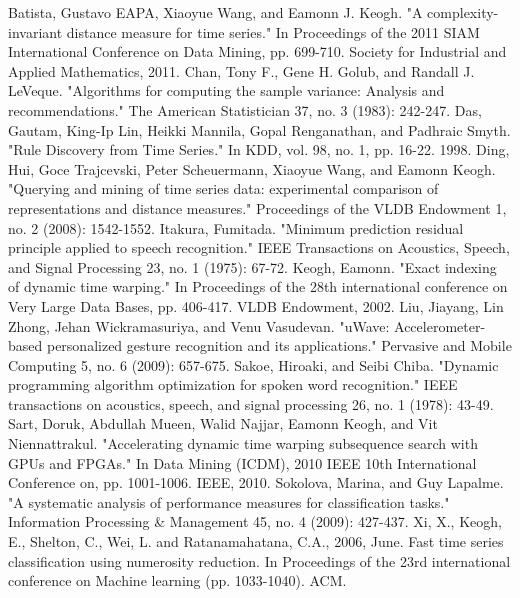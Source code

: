 \begin{thebibliography}{1}
     Batista, Gustavo EAPA, Xiaoyue Wang, and Eamonn J. Keogh. "A complexity-invariant
        distance measure for time series." In Proceedings of the 2011 SIAM International Conference on Data Mining, pp.
        699-710. Society for Industrial and Applied Mathematics, 2011.
     Chan, Tony F., Gene H. Golub, and Randall J. LeVeque. "Algorithms for computing the
        sample variance: Analysis and recommendations." The American Statistician 37, no. 3 (1983): 242-247.
     Das, Gautam, King-Ip Lin, Heikki Mannila, Gopal Renganathan, and Padhraic Smyth. "Rule
        Discovery from Time Series." In KDD, vol. 98, no. 1, pp. 16-22. 1998.
     Ding, Hui, Goce Trajcevski, Peter Scheuermann, Xiaoyue Wang, and Eamonn Keogh. "Querying
        and mining of time series data: experimental comparison of representations and distance measures." Proceedings
        of the VLDB Endowment 1, no. 2 (2008): 1542-1552.
     Itakura, Fumitada. "Minimum prediction residual principle applied to speech
        recognition." IEEE Transactions on Acoustics, Speech, and Signal Processing 23, no. 1 (1975): 67-72.
     Keogh, Eamonn. "Exact indexing of dynamic time warping." In Proceedings of the 28th
        international conference on Very Large Data Bases, pp. 406-417. VLDB Endowment, 2002.
     Liu, Jiayang, Lin Zhong, Jehan Wickramasuriya, and Venu Vasudevan. "uWave:
        Accelerometer-based personalized gesture recognition and its applications." Pervasive and Mobile Computing 5,
        no. 6 (2009): 657-675.
     Sakoe, Hiroaki, and Seibi Chiba. "Dynamic programming algorithm optimization for spoken
        word recognition." IEEE transactions on acoustics, speech, and signal processing 26, no. 1 (1978): 43-49.
     Sart, Doruk, Abdullah Mueen, Walid Najjar, Eamonn Keogh, and Vit Niennattrakul.
        "Accelerating dynamic time warping subsequence search with GPUs and FPGAs." In Data Mining (ICDM), 2010 IEEE
        10th International Conference on, pp. 1001-1006. IEEE, 2010.
     Sokolova, Marina, and Guy Lapalme. "A systematic analysis of performance measures
        for classification tasks." Information Processing \& Management 45, no. 4 (2009): 427-437.
     Xi, X., Keogh, E., Shelton, C., Wei, L. and Ratanamahatana, C.A., 2006, June. Fast time series
        classification using numerosity reduction. In Proceedings of the 23rd international conference on Machine
        learning (pp. 1033-1040). ACM.
\end{thebibliography}
